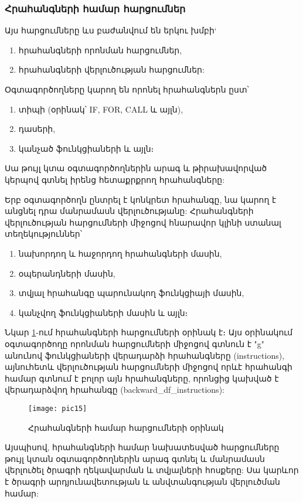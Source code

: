 \subsubsection*{Հրահանգների համար հարցումներ}\label{subsubsec:instructions}

Այս հարցումները ևս բաժանվում են երկու խմբի`
\begin{enumerate}
    \item հրահանգների որոնման հարցումներ,
    \item հրահանգների վերլուծության հարցումներ:
\end{enumerate}

Օգտագործողները կարող են որոնել հրահանգներն ըստ՝
\begin{enumerate}
    \item տիպի (օրինակ՝ IF, FOR, CALL և այլն),
    \item դասերի,
    \item կանչած ֆունկցիաների և այլն։
\end{enumerate}

Սա թույլ կտա օգտագործողներին արագ և թիրախավորված կերպով գտնել իրենց հետաքրքրող հրահանգները:

Երբ օգտագործողն ընտրել է կոնկրետ հրահանգը, նա կարող է անցնել դրա մանրամասն վերլուծությանը:  Հրահանգների վերլուծության հարցումների
միջոցով հնարավոր կլինի ստանալ տեղեկություններ՝
\begin{enumerate}
    \item նախորդող և հաջորդող հրահանգների մասին,
    \item օպերանդների մասին,
    \item տվյալ հրահանգը պարունակող ֆունկցիայի մասին,
    \item կանչվող ֆունկցիաների մասին և այլն։
\end{enumerate}

Նկար \ref{fig:figure15}-ում հրահանգների հարցումների օրինակ է։ Այս օրինակում օգտագործողը որոնման հարցումների միջոցով գտնուն է
"g" անունով ֆունկցիաների վերադարձի հրահանգները (instructions), այնուհետև վերլուծության հարցումների միջոցով որևէ հրահանգի համար
գտնում է բոլոր այն հրահանգները, որոնցից կախված է վերադարձվող հրահանգը (backward\_df\_instructions):

\begin{figure}[h]
    \centering
    \texttt{[image: pic15]}
    \caption{Հրահանգների համար հարցումների օրինակ}
    \label{fig:figure15}
\end{figure}

Այսպիսով, հրահանգների համար նախատեսված հարցումները թույլ կտան օգտագործողներին արագ գտնել և մանրամասն վերլուծել
ծրագրի ղեկավարման և տվյալների հոսքերը: Սա կարևոր է ծրագրի արդյունավետության և անվտանգության վերլուծման համար:
